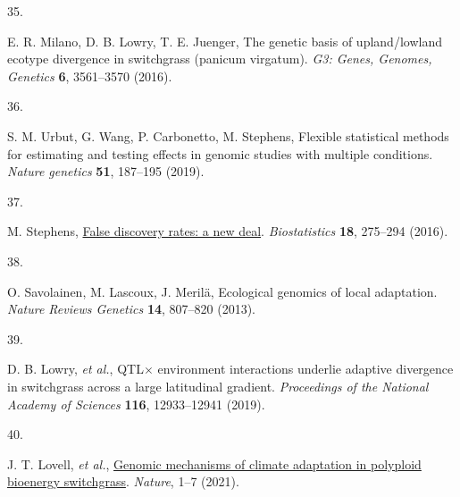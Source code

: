\documentclass[
  9pt,
  twocolumn,
  twoside]{pnas-new}
\newlength{\cslhangindent}
\newlength{\csllabelwidth}
\newenvironment{CSLReferences}[2] %
 {\begin{list}{}{%
  \setlength{\itemindent}{0pt}
  \setlength{\leftmargin}{0pt}
  \setlength{\parsep}{0pt}
  \ifodd #1
   \setlength{\leftmargin}{\cslhangindent}
   \setlength{\itemindent}{-1\cslhangindent}
  \fi
  \setlength{\itemsep}{#2\baselineskip}}}
 {\end{list}}
\newcommand{\CSLLeftMargin}[1]{\parbox[t]{\csllabelwidth}{\strut#1\strut}}
\newcommand{\CSLRightInline}[1]{\parbox[t]{\linewidth - \csllabelwidth}{\strut#1\strut}}
\begin{document}
\begin{CSLReferences}{0}{1}
\CSLLeftMargin{35. }%
\CSLRightInline{E. R. Milano, D. B. Lowry, T. E. Juenger, The genetic
basis of upland/lowland ecotype divergence in switchgrass (panicum
virgatum). \emph{G3: Genes, Genomes, Genetics} \textbf{6}, 3561--3570
(2016).}

\CSLLeftMargin{36. }%
\CSLRightInline{S. M. Urbut, G. Wang, P. Carbonetto, M. Stephens,
Flexible statistical methods for estimating and testing effects in
genomic studies with multiple conditions. \emph{Nature genetics}
\textbf{51}, 187--195 (2019).}

\CSLLeftMargin{37. }%
\CSLRightInline{M. Stephens,
\href{https://doi.org/10.1093/biostatistics/kxw041}{{False discovery
rates: a new deal}}. \emph{Biostatistics} \textbf{18}, 275--294 (2016).}

\CSLLeftMargin{38. }%
\CSLRightInline{O. Savolainen, M. Lascoux, J. Merilä, Ecological
genomics of local adaptation. \emph{Nature Reviews Genetics}
\textbf{14}, 807--820 (2013).}

\CSLLeftMargin{39. }%
\CSLRightInline{D. B. Lowry, \emph{et al.}, QTL\(\times\) environment
interactions underlie adaptive divergence in switchgrass across a large
latitudinal gradient. \emph{Proceedings of the National Academy of
Sciences} \textbf{116}, 12933--12941 (2019).}

\CSLLeftMargin{40. }%
\CSLRightInline{J. T. Lovell, \emph{et al.},
\href{https://doi.org/10.1038/s41586-020-03127-1}{Genomic mechanisms of
climate adaptation in polyploid bioenergy switchgrass}. \emph{Nature},
1--7 (2021).}

\end{CSLReferences}


\showacknow{} %
\end{document}
